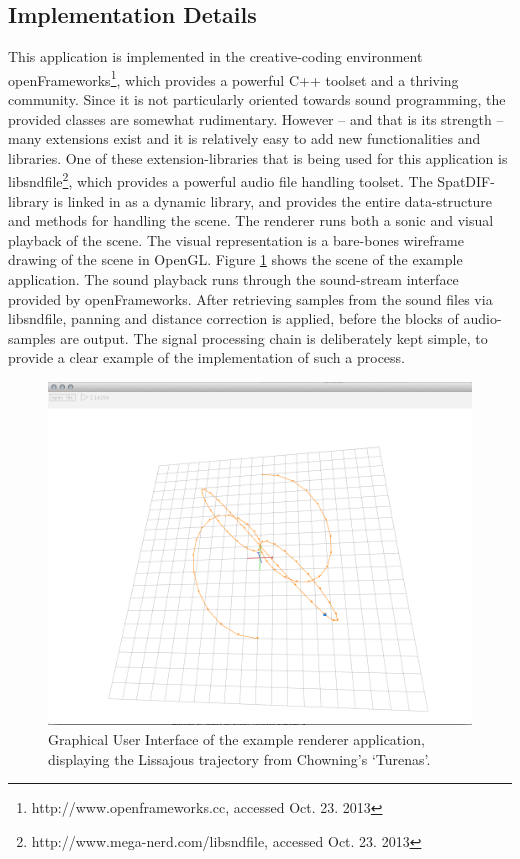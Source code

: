 \documentclass[a4paper]{article}
\begin{document}
\subsection{Implementation Details}

This application is implemented in the creative-coding environment openFrameworks\footnote{http://www.openframeworks.cc, accessed Oct. 23. 2013}, which provides a powerful C++ toolset and a thriving community.
Since it is not particularly oriented towards sound programming, the provided classes are somewhat rudimentary.
However -- and that is its strength -- many extensions exist and it is relatively easy to add new functionalities and libraries.
One of these extension-libraries that is being used for this application is libsndfile\footnote{http://www.mega-nerd.com/libsndfile, accessed Oct. 23. 2013}, which provides a powerful audio file handling toolset.
The SpatDIF-library is linked in as a dynamic library, and provides the entire data-structure and methods for handling the scene.
The renderer runs both a sonic and visual playback of the scene.
The visual representation is a bare-bones wireframe drawing of the scene in OpenGL.
Figure \ref{fig:screenshot} shows the scene of the example application.
The sound playback runs through the sound-stream interface provided by openFrameworks.
After retrieving samples from the sound files via libsndfile, panning and distance correction is applied, before the blocks of audio-samples are output.
The signal processing chain is deliberately kept simple, to provide a clear example of the implementation of such a process.

\begin{figure}[h]
\centerline{
	\includegraphics[width=\columnwidth]{SpatDIFrenderer_screenshot2}}
\caption{Graphical User Interface of the example renderer application, displaying the Lissajous trajectory from Chowning's `Turenas'. 
}
\label{fig:screenshot}
\end{figure}
\end{document}
